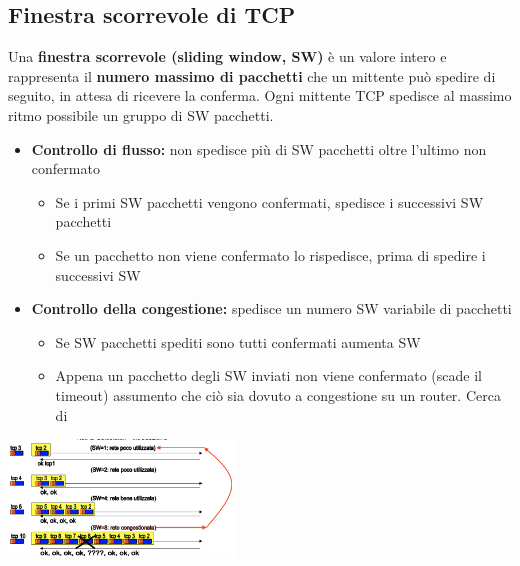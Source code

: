 \documentclass{article}
\begin{document}
\subsection{Finestra scorrevole di TCP}
Una \textbf{finestra scorrevole (sliding window, SW)} è un valore intero e rappresenta il \textbf{numero massimo di pacchetti} che un mittente può spedire di seguito, in attesa di ricevere la conferma. Ogni mittente TCP spedisce al massimo ritmo possibile un gruppo di SW pacchetti.
\begin{itemize}
    \item \textbf{Controllo di flusso:} non spedisce più di SW pacchetti oltre l'ultimo non confermato
    \begin{itemize}
        \item Se i primi SW pacchetti vengono confermati, spedisce i successivi SW pacchetti
        \item Se un pacchetto non viene confermato lo rispedisce, prima di spedire i successivi SW
    \end{itemize}
    \item \textbf{Controllo della congestione:} spedisce un numero SW variabile di pacchetti
    \begin{itemize}
        \item Se SW pacchetti spediti sono tutti confermati aumenta SW
        \item Appena un pacchetto degli SW inviati non viene confermato (scade il timeout) assumento che ciò sia dovuto a congestione su un router. Cerca di 
    \end{itemize}
\end{itemize}
\begin{center}
    \includegraphics[width=6cm]{img/aumentoPacchetti.png}
\end{center}
\end{document}
